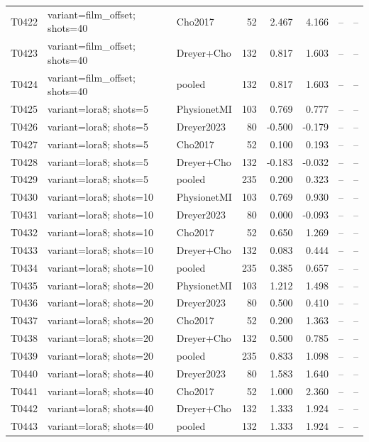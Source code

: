 \begin{longtable}{p{.45in}p{2.6in}p{.75in}rrrrr}
T0422 & variant=film\_\allowbreak{}offset; shots=40 & Cho2017 & 52 & 2.467 & 4.166 & -- & -- \\
T0423 & variant=film\_\allowbreak{}offset; shots=40 & Dreyer+Cho & 132 & 0.817 & 1.603 & -- & -- \\
T0424 & variant=film\_\allowbreak{}offset; shots=40 & pooled & 132 & 0.817 & 1.603 & -- & -- \\
T0425 & variant=lora8; shots=5 & PhysionetMI & 103 & 0.769 & 0.777 & -- & -- \\
T0426 & variant=lora8; shots=5 & Dreyer2023 & 80 & -0.500 & -0.179 & -- & -- \\
T0427 & variant=lora8; shots=5 & Cho2017 & 52 & 0.100 & 0.193 & -- & -- \\
T0428 & variant=lora8; shots=5 & Dreyer+Cho & 132 & -0.183 & -0.032 & -- & -- \\
T0429 & variant=lora8; shots=5 & pooled & 235 & 0.200 & 0.323 & -- & -- \\
T0430 & variant=lora8; shots=10 & PhysionetMI & 103 & 0.769 & 0.930 & -- & -- \\
T0431 & variant=lora8; shots=10 & Dreyer2023 & 80 & 0.000 & -0.093 & -- & -- \\
T0432 & variant=lora8; shots=10 & Cho2017 & 52 & 0.650 & 1.269 & -- & -- \\
T0433 & variant=lora8; shots=10 & Dreyer+Cho & 132 & 0.083 & 0.444 & -- & -- \\
T0434 & variant=lora8; shots=10 & pooled & 235 & 0.385 & 0.657 & -- & -- \\
T0435 & variant=lora8; shots=20 & PhysionetMI & 103 & 1.212 & 1.498 & -- & -- \\
T0436 & variant=lora8; shots=20 & Dreyer2023 & 80 & 0.500 & 0.410 & -- & -- \\
T0437 & variant=lora8; shots=20 & Cho2017 & 52 & 0.200 & 1.363 & -- & -- \\
T0438 & variant=lora8; shots=20 & Dreyer+Cho & 132 & 0.500 & 0.785 & -- & -- \\
T0439 & variant=lora8; shots=20 & pooled & 235 & 0.833 & 1.098 & -- & -- \\
T0440 & variant=lora8; shots=40 & Dreyer2023 & 80 & 1.583 & 1.640 & -- & -- \\
T0441 & variant=lora8; shots=40 & Cho2017 & 52 & 1.000 & 2.360 & -- & -- \\
T0442 & variant=lora8; shots=40 & Dreyer+Cho & 132 & 1.333 & 1.924 & -- & -- \\
T0443 & variant=lora8; shots=40 & pooled & 132 & 1.333 & 1.924 & -- & -- \\
\bottomrule
\end{longtable}
